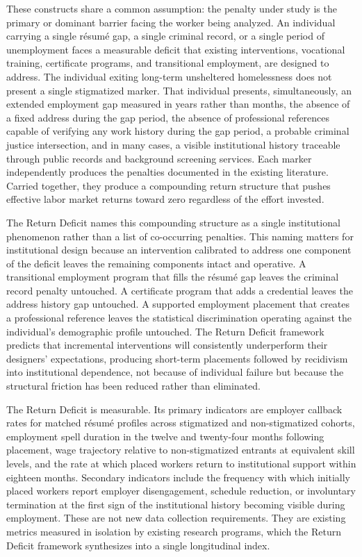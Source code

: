 \documentclass[12pt, letterpaper]{article}
\begin{document}
These constructs share a common assumption: the penalty under study is the primary or dominant barrier facing the worker being analyzed. An individual carrying a single r\'{e}sum\'{e} gap, a single criminal record, or a single period of unemployment faces a measurable deficit that existing interventions, vocational training, certificate programs, and transitional employment, are designed to address. The individual exiting long-term unsheltered homelessness does not present a single stigmatized marker. That individual presents, simultaneously, an extended employment gap measured in years rather than months, the absence of a fixed address during the gap period, the absence of professional references capable of verifying any work history during the gap period, a probable criminal justice intersection, and in many cases, a visible institutional history traceable through public records and background screening services. Each marker independently produces the penalties documented in the existing literature. Carried together, they produce a compounding return structure that pushes effective labor market returns toward zero regardless of the effort invested.

The Return Deficit names this compounding structure as a single institutional phenomenon rather than a list of co-occurring penalties. This naming matters for institutional design because an intervention calibrated to address one component of the deficit leaves the remaining components intact and operative. A transitional employment program that fills the r\'{e}sum\'{e} gap leaves the criminal record penalty untouched. A certificate program that adds a credential leaves the address history gap untouched. A supported employment placement that creates a professional reference leaves the statistical discrimination operating against the individual's demographic profile untouched. The Return Deficit framework predicts that incremental interventions will consistently underperform their designers' expectations, producing short-term placements followed by recidivism into institutional dependence, not because of individual failure but because the structural friction has been reduced rather than eliminated.

The Return Deficit is measurable. Its primary indicators are employer callback rates for matched r\'{e}sum\'{e} profiles across stigmatized and non-stigmatized cohorts, employment spell duration in the twelve and twenty-four months following placement, wage trajectory relative to non-stigmatized entrants at equivalent skill levels, and the rate at which placed workers return to institutional support within eighteen months. Secondary indicators include the frequency with which initially placed workers report employer disengagement, schedule reduction, or involuntary termination at the first sign of the institutional history becoming visible during employment. These are not new data collection requirements. They are existing metrics measured in isolation by existing research programs, which the Return Deficit framework synthesizes into a single longitudinal index.
\end{document}
